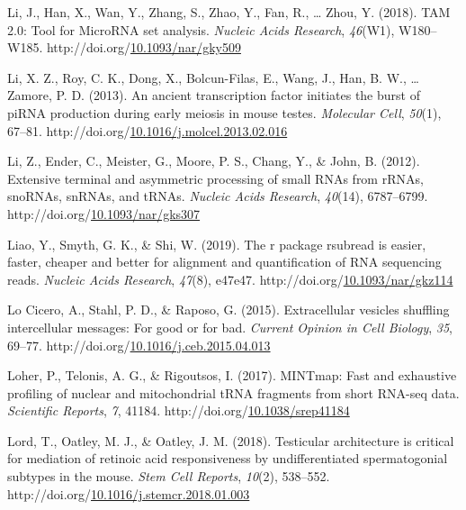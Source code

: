 \documentclass[12pt,twoside]{reedthesis}
\newlength{\cslhangindent}
\newenvironment{CSLReferences}[2] %
 {%
  \setlength{\parindent}{0pt}
  \ifodd #1 \everypar{\setlength{\hangindent}{\cslhangindent}}\ignorespaces\fi
  \ifnum #2 > 0
  \setlength{\parskip}{#2\baselineskip}
  \fi
 }%
 {}
\begin{document}
\begin{CSLReferences}{1}{0}
\leavevmode{}%
Li, J., Han, X., Wan, Y., Zhang, S., Zhao, Y., Fan, R., \ldots{} Zhou, Y. (2018). TAM 2.0: Tool for MicroRNA set analysis. \emph{Nucleic Acids Research}, \emph{46}(W1), W180--W185. http://doi.org/\href{https://doi.org/10.1093/nar/gky509}{10.1093/nar/gky509}

\leavevmode{}%
Li, X. Z., Roy, C. K., Dong, X., Bolcun-Filas, E., Wang, J., Han, B. W., \ldots{} Zamore, P. D. (2013). An ancient transcription factor initiates the burst of piRNA production during early meiosis in mouse testes. \emph{Molecular Cell}, \emph{50}(1), 67--81. http://doi.org/\href{https://doi.org/10.1016/j.molcel.2013.02.016}{10.1016/j.molcel.2013.02.016}

\leavevmode{}%
Li, Z., Ender, C., Meister, G., Moore, P. S., Chang, Y., \& John, B. (2012). Extensive terminal and asymmetric processing of small RNAs from rRNAs, snoRNAs, snRNAs, and tRNAs. \emph{Nucleic Acids Research}, \emph{40}(14), 6787--6799. http://doi.org/\href{https://doi.org/10.1093/nar/gks307}{10.1093/nar/gks307}

\leavevmode{}%
Liao, Y., Smyth, G. K., \& Shi, W. (2019). The r package rsubread is easier, faster, cheaper and better for alignment and quantification of RNA sequencing reads. \emph{Nucleic Acids Research}, \emph{47}(8), e47e47. http://doi.org/\href{https://doi.org/10.1093/nar/gkz114}{10.1093/nar/gkz114}

\leavevmode{}%
Lo Cicero, A., Stahl, P. D., \& Raposo, G. (2015). Extracellular vesicles shuffling intercellular messages: For good or for bad. \emph{Current Opinion in Cell Biology}, \emph{35}, 69--77. http://doi.org/\href{https://doi.org/10.1016/j.ceb.2015.04.013}{10.1016/j.ceb.2015.04.013}

\leavevmode{}%
Loher, P., Telonis, A. G., \& Rigoutsos, I. (2017). MINTmap: Fast and exhaustive profiling of nuclear and mitochondrial tRNA fragments from short RNA-seq data. \emph{Scientific Reports}, \emph{7}, 41184. http://doi.org/\href{https://doi.org/10.1038/srep41184}{10.1038/srep41184}

\leavevmode{}%
Lord, T., Oatley, M. J., \& Oatley, J. M. (2018). Testicular architecture is critical for mediation of retinoic acid responsiveness by undifferentiated spermatogonial subtypes in the mouse. \emph{Stem Cell Reports}, \emph{10}(2), 538--552. http://doi.org/\href{https://doi.org/10.1016/j.stemcr.2018.01.003}{10.1016/j.stemcr.2018.01.003}


\end{CSLReferences}
\end{document}
